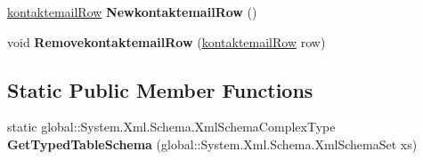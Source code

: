 \begin{DoxyCompactItemize}
\item 
\hyperlink{class_products_1_1_data_1_1ds_sage_1_1kontaktemail_row}{kontaktemail\+Row} {\bfseries Newkontaktemail\+Row} ()\hypertarget{class_products_1_1_data_1_1ds_sage_1_1kontaktemail_data_table_a022e9bc9959bdd83018d423b4de38714}{}\label{class_products_1_1_data_1_1ds_sage_1_1kontaktemail_data_table_a022e9bc9959bdd83018d423b4de38714}

\item 
void {\bfseries Removekontaktemail\+Row} (\hyperlink{class_products_1_1_data_1_1ds_sage_1_1kontaktemail_row}{kontaktemail\+Row} row)\hypertarget{class_products_1_1_data_1_1ds_sage_1_1kontaktemail_data_table_a28fe7b7e44a7ad4f7cd577bfa72399f9}{}\label{class_products_1_1_data_1_1ds_sage_1_1kontaktemail_data_table_a28fe7b7e44a7ad4f7cd577bfa72399f9}

\end{DoxyCompactItemize}
\subsection*{Static Public Member Functions}
\begin{DoxyCompactItemize}
\item 
static global\+::\+System.\+Xml.\+Schema.\+Xml\+Schema\+Complex\+Type {\bfseries Get\+Typed\+Table\+Schema} (global\+::\+System.\+Xml.\+Schema.\+Xml\+Schema\+Set xs)\hypertarget{class_products_1_1_data_1_1ds_sage_1_1kontaktemail_data_table_a64cd46ecd8418f540adc958bc641e173}{}\label{class_products_1_1_data_1_1ds_sage_1_1kontaktemail_data_table_a64cd46ecd8418f540adc958bc641e173}

\end{DoxyCompactItemize}
